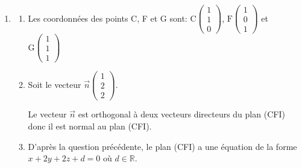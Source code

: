 \documentclass[10pt]{article}
\providecommand{\R}{\mathbb{R}}
\providecommand{\vect}[1]{\overrightarrow{#1}}
\providecommand{\vectt}[1]{\overrightarrow{\mathrm{#1}}}
\begin{document}
\begin{enumerate}
\item 
	\begin{enumerate}
		\item Les coordonnées des points C, F et G sont:
$\text{C}\begin{pmatrix}1\\1\\0\end{pmatrix}$, $\text{F}\begin{pmatrix}1\\0\\1\end{pmatrix}$ et $\text{G}\begin{pmatrix}1\\1\\1\end{pmatrix}$
		
		\item Soit le vecteur $\vect{n}\begin{pmatrix}1\\2\\2\end{pmatrix}$.
		

Le vecteur $\vect{n}$ est orthogonal à deux vecteurs directeurs du plan (CFI) donc il est normal au plan (CFI).
	
		\item
D'après la question précédente, le plan (CFI) a une équation de la forme \\
$x+2y+2z+d=0$ où $d\in\R$.


\end{enumerate}
\end{enumerate}
\end{document}
